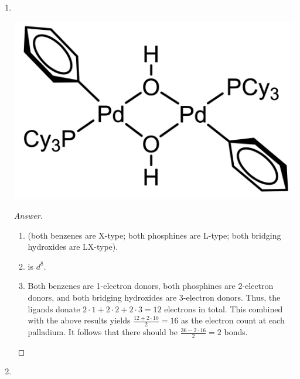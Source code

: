\documentclass[../psets.tex]{subfiles}
\begin{document}
\begin{enumerate}
\begin{enumerate}[label={\arabic*)}]
\begin{center}
        \end{center}
        \begin{proof}[Answer]\leavevmode
            \begin{enumerate}[label={(\roman*)}]
                \item {} (both carbonyls are L-type; the other ligand is X-type; the charge is $1-$).
                \item {} is $d^8$.
                \item Both carbonyls are 2-electron donors, and the methylcyclopentadienyl group is a 5-electron donor. Thus, the ligands donate $2\cdot 2+1\cdot 5=9$ electrons in total. This combined with the above results yields $9+8-(-1)=18$ as the electron count.
            \end{enumerate}
        \end{proof}
        \item ${\color{white}hi}$
        \begin{center}
            \includegraphics[width=0.34\linewidth]{../ExtFiles/pset1-1-12.png}
        \end{center}
        \begin{proof}[Answer]\leavevmode
            \begin{enumerate}[label={(\roman*)}]
                \item {} (both benzenes are X-type; both phosphines are L-type; both bridging hydroxides are LX-type).
                \item {} is $d^8$.
                \item Both benzenes are 1-electron donors, both phosphines are 2-electron donors, and both bridging hydroxides are 3-electron donors. Thus, the ligands donate $2\cdot 1+2\cdot 2+2\cdot 3=12$ electrons in total. This combined with the above results yields $\frac{12+2\cdot 10}{2}=16$ as the electron count at each palladium. It follows that there should be $\frac{36-2\cdot 16}{2}=2$  bonds.
            \end{enumerate}
        \end{proof}
        \newpage
        \item ${\color{white}hi}$
        \begin{center}

\end{center}
\end{enumerate}
\end{enumerate}
\end{document}
